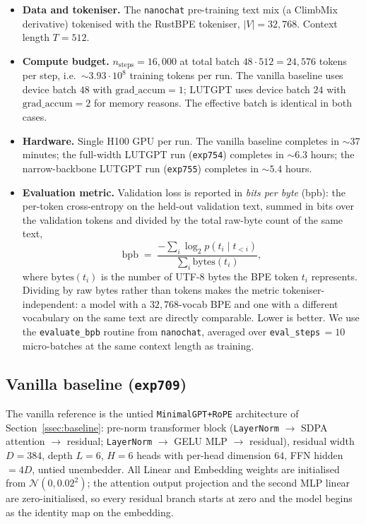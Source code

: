 \documentclass[11pt]{article}
\begin{document}
\begin{itemize}[leftmargin=*,topsep=2pt,itemsep=1pt]
\item \textbf{Data and tokeniser.} The \texttt{nanochat} pre-training text mix (a ClimbMix derivative) tokenised with the RustBPE tokeniser, $|V| = 32{,}768$. Context length $T = 512$.
\item \textbf{Compute budget.} $n_{\mathrm{steps}} = 16{,}000$ at total batch $48 \cdot 512 = 24{,}576$ tokens per step, i.e.\ $\sim 3.93 \cdot 10^8$ training tokens per run. The vanilla baseline uses device batch $48$ with $\mathrm{grad\_accum} = 1$; LUTGPT uses device batch $24$ with $\mathrm{grad\_accum} = 2$ for memory reasons. The effective batch is identical in both cases.
\item \textbf{Hardware.} Single H100 GPU per run. The vanilla baseline completes in $\sim 37$ minutes; the full-width LUTGPT run (\texttt{exp754}) completes in $\sim 6.3$ hours; the narrow-backbone LUTGPT run (\texttt{exp755}) completes in $\sim 5.4$ hours.
\item \textbf{Evaluation metric.} Validation loss is reported in \emph{bits per byte} (bpb): the per-token cross-entropy on the held-out validation text, summed in bits over the validation tokens and divided by the total raw-byte count of the same text,
\[
\mathrm{bpb} \;=\; \frac{-\sum_i \log_2 p(t_i \mid t_{<i})}{\sum_i \mathrm{bytes}(t_i)},
\]
where $\mathrm{bytes}(t_i)$ is the number of UTF-8 bytes the BPE token $t_i$ represents. Dividing by raw bytes rather than tokens makes the metric tokeniser-independent: a model with a $32{,}768$-vocab BPE and one with a different vocabulary on the same text are directly comparable. Lower is better. We use the \texttt{evaluate\_bpb} routine from \texttt{nanochat}, averaged over \texttt{eval\_steps}\,$=10$ micro-batches at the same context length as training.
\end{itemize}

\subsection{Vanilla baseline (\texttt{exp709})}
\label{ssec:exp-baseline}

The vanilla reference is the untied \texttt{MinimalGPT+RoPE} architecture of Section~\ref{ssec:baseline}: pre-norm transformer block (\texttt{LayerNorm} $\to$ SDPA attention $\to$ residual; \texttt{LayerNorm} $\to$ GELU MLP $\to$ residual), residual width $D = 384$, depth $L = 6$, $H = 6$ heads with per-head dimension $64$, FFN hidden $= 4D$, untied unembedder. All Linear and Embedding weights are initialised from $\mathcal{N}(0, 0.02^2)$; the attention output projection and the second MLP linear are zero-initialised, so every residual branch starts at zero and the model begins as the identity map on the embedding.
\end{document}
